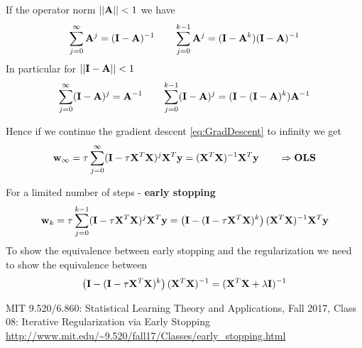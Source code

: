 If the operator norm $||\mathbf{A}|| < 1$ we have
\begin{equation*}
\sum_{j=0}^{\infty} \mathbf{A}^j = (\mathbf{I}-\mathbf{A})^{-1} \qquad \sum_{j=0}^{k-1} \mathbf{A}^j = (\mathbf{I}-\mathbf{A}^k)(\mathbf{I}-\mathbf{A})^{-1}
\end{equation*}
In particular for $||\mathbf{I} - \mathbf{A}|| < 1$
\begin{equation*}
\sum_{j=0}^{\infty} (\mathbf{I} - \mathbf{A})^j = \mathbf{A}^{-1} \qquad \sum_{j=0}^{k-1} (\mathbf{I} - \mathbf{A})^j = (\mathbf{I} - (\mathbf{I}- \mathbf{A})^k) \mathbf{A}^{-1}
\end{equation*}

Hence if we continue the gradient descent \eqref{eq:GradDescent} to infinity we get
\begin{equation}
\mathbf{w}_{\infty} = \tau \sum_{j=0}^{\infty} (\mathbf{I} - \tau \mathbf{X}^T \mathbf{X})^j \mathbf{X}^T \mathbf{y} = (\mathbf{X}^T \mathbf{X})^{-1} \mathbf{X}^T \mathbf{y}  \qquad \Rightarrow \textbf{OLS}
\end{equation}

For a limited number of steps - \textbf{early stopping}
\begin{equation}
\mathbf{w}_{k}  = \tau \sum_{j=0}^{k-1} (\mathbf{I} - \tau \mathbf{X}^T \mathbf{X})^j \mathbf{X}^T \mathbf{y} 
= \left(\mathbf{I} - (\mathbf{I} - \tau \mathbf{X}^T \mathbf{X})^k \right) (\mathbf{X}^T \mathbf{X})^{-1} \mathbf{X}^T \mathbf{y}
\end{equation}
To show the equivalence between early stopping and the regularization we need to show the equivalence between
\begin{equation}
\left(\mathbf{I} - (\mathbf{I} - \tau \mathbf{X}^T \mathbf{X})^k \right) (\mathbf{X}^T \mathbf{X})^{-1} = (\mathbf{X}^T \mathbf{X} + \lambda \mathbf{I})^{-1}
\end{equation}







\begin{thebibliography}{9}

MIT 9.520/6.860: Statistical Learning Theory and Applications, Fall 2017, Class 08: Iterative Regularization via Early Stopping \url{http://www.mit.edu/~9.520/fall17/Classes/early_stopping.html}


\end{thebibliography}






